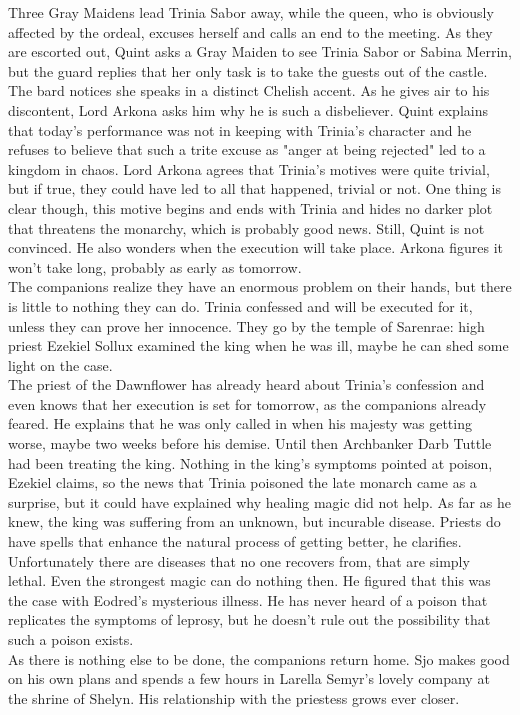 Three Gray Maidens lead Trinia Sabor away, while the queen, who is obviously affected by the ordeal, excuses herself and calls an end to the meeting. As they are escorted out, Quint asks a Gray Maiden to see Trinia Sabor or Sabina Merrin, but the guard replies that her only task is to take the guests out of the castle. The bard notices she speaks in a distinct Chelish accent. As he gives air to his discontent, Lord Arkona asks him why he is such a disbeliever. Quint explains that today's performance was not in keeping with Trinia's character and he refuses to believe that such a trite excuse as "anger at being rejected" led to a kingdom in chaos. Lord Arkona agrees that Trinia's motives were quite trivial, but if true, they could have led to all that happened, trivial or not. One thing is clear though, this motive begins and ends with Trinia and hides no darker plot that threatens the monarchy, which is probably good news. Still, Quint is not convinced. He also wonders when the execution will take place. Arkona figures it won't take long, probably as early as tomorrow.\\

The companions realize they have an enormous problem on their hands, but there is little to nothing they can do. Trinia confessed and will be executed for it, unless they can prove her innocence. They go by the temple of Sarenrae: high priest Ezekiel Sollux examined the king when he was ill, maybe he can shed some light on the case.\\

The priest of the Dawnflower has already heard about Trinia's confession and even knows that her execution is set for tomorrow, as the companions already feared. He explains that he was only called in when his majesty was getting worse, maybe two weeks before his demise. Until then Archbanker Darb Tuttle had been treating the king. Nothing in the king's symptoms pointed at poison, Ezekiel claims, so the news that Trinia poisoned the late monarch came as a surprise, but it could have explained why healing magic did not help. As far as he knew, the king was suffering from an unknown, but incurable disease. Priests do have spells that enhance the natural process of getting better, he clarifies. Unfortunately there are diseases that no one recovers from, that are simply lethal. Even the strongest magic can do nothing then. He figured that this was the case with Eodred's mysterious illness. He has never heard of a poison that replicates the symptoms of leprosy, but he doesn't rule out the possibility that such a poison exists.\\

As there is nothing else to be done, the companions return home. Sjo makes good on his own plans and spends a few hours in Larella Semyr's lovely company at the shrine of Shelyn. His relationship with the priestess grows ever closer.\\

